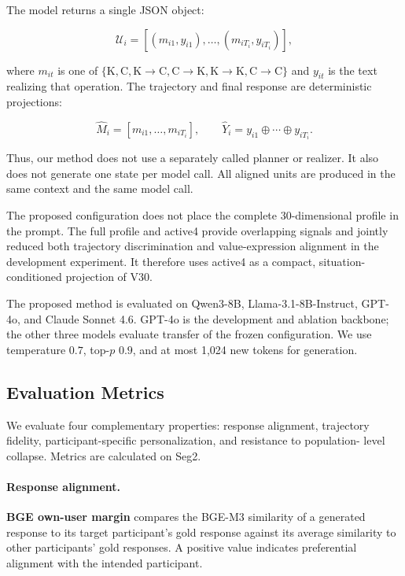 The model returns a single JSON object:

\begin{equation}
\mathcal{U}_i =
\left[(m_{i1},y_{i1}),\ldots,(m_{iT_i},y_{iT_i})\right],
\end{equation}

where $m_{it}$ is one of
$\{\mathrm{K},\mathrm{C},\mathrm{K{\to}C},\mathrm{C{\to}K},
\mathrm{K{\to}K},\mathrm{C{\to}C}\}$ and $y_{it}$ is the text realizing that
operation. The trajectory and final response are deterministic projections:

\begin{equation}
\hat{M}_i=[m_{i1},\ldots,m_{iT_i}], \qquad
\hat{Y}_i=y_{i1}\oplus\cdots\oplus y_{iT_i}.
\end{equation}

Thus, our method does not use a separately called planner or realizer. It also does
not generate one state per model call. All aligned units are produced in the
same context and the same model call.

The proposed configuration does not place the complete
30-dimensional profile in the prompt. The full profile and active4 provide
overlapping signals and jointly reduced both trajectory discrimination and
value-expression alignment in the development experiment. It therefore uses
active4 as a compact, situation-conditioned projection of V30.

The proposed method is evaluated on Qwen3-8B, Llama-3.1-8B-Instruct, GPT-4o,
and Claude Sonnet 4.6. GPT-4o is the development and ablation backbone; the
other three models evaluate transfer of the frozen
configuration. We use temperature $0.7$, top-$p$ $0.9$, and at most 1,024 new
tokens for generation.

\subsection{Evaluation Metrics}
\label{sec:evaluation_metrics}

We evaluate four complementary properties: response alignment, trajectory
fidelity, participant-specific personalization, and resistance to population-
level collapse. Metrics are calculated on Seg2.

\paragraph{Response alignment.}
\textbf{BGE own-user margin} compares the BGE-M3 similarity of a generated
response to its target participant's gold response against its average
similarity to other participants' gold responses. A positive value indicates
preferential alignment with the intended participant.

